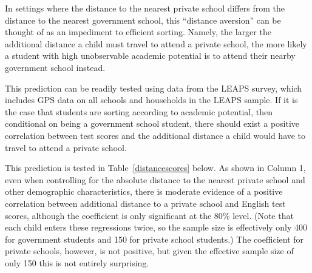 \documentclass[12pt]{article}
\begin{document}
In settings where the distance to the nearest private school differs from the distance to the nearest government school, this ``distance aversion'' can be thought of as an impediment to efficient sorting. Namely, the larger the additional distance a child must travel to attend a private school, the more likely a student with high unobservable academic potential is to attend their nearby government school instead.  

This prediction can be readily tested using data from the LEAPS survey, which includes GPS data on all schools and households in the LEAPS sample. If it is the case that students are sorting according to academic potential, then conditional on being a government school student, there should exist a positive correlation between test scores and the additional distance a child would have to travel to attend a private school. 

This prediction is tested in Table~\ref{distancescores} below. As shown in Column 1, even when controlling for the absolute distance to the nearest private school and other demographic characteristics, there is moderate evidence of a positive correlation between additional distance to a private school and English test scores, although the coefficient is only significant at the 80\% level. (Note that each child enters these regressions twice, so the sample size is effectively only 400 for government students and 150 for private school students.) The coefficient for private schools, however, is not positive, but given the effective sample size of only 150 this is not entirely surprising. 


\end{document}
